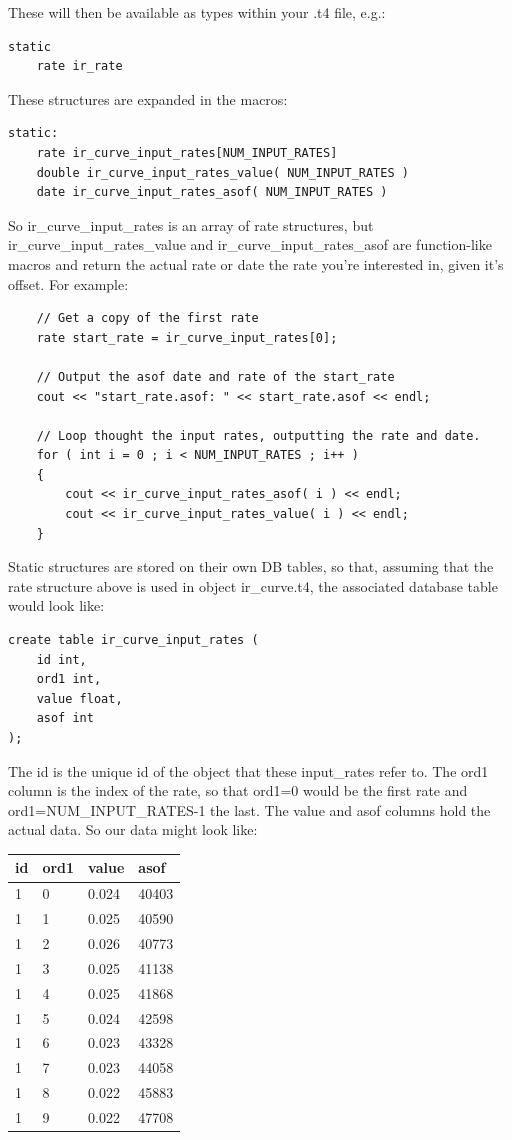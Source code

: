 \documentclass{report}
\begin{document}
These will then be available as types within your .t4 file, e.g.:

\begin{verbatim}
static
    rate ir_rate
\end{verbatim}

These structures are expanded in the macros:

\begin{verbatim}
static:
    rate ir_curve_input_rates[NUM_INPUT_RATES]
    double ir_curve_input_rates_value( NUM_INPUT_RATES )
    date ir_curve_input_rates_asof( NUM_INPUT_RATES )
\end{verbatim}

So ir_curve_input_rates is an array of rate structures, but ir_curve_input_rates_value and ir_curve_input_rates_asof are function-like macros and return the actual rate or date the rate you're interested in, given it's offset. For example:

\begin{verbatim}
    // Get a copy of the first rate
    rate start_rate = ir_curve_input_rates[0];

    // Output the asof date and rate of the start_rate
    cout << "start_rate.asof: " << start_rate.asof << endl;

    // Loop thought the input rates, outputting the rate and date.
    for ( int i = 0 ; i < NUM_INPUT_RATES ; i++ )
    {
        cout << ir_curve_input_rates_asof( i ) << endl;
        cout << ir_curve_input_rates_value( i ) << endl;
    }
\end{verbatim}


Static structures are stored on their own DB tables, so that, assuming that the rate structure above is used in object ir_curve.t4, the associated database table would look like:

\begin{verbatim}
create table ir_curve_input_rates (
    id int,
    ord1 int,
    value float,
    asof int
);
\end{verbatim}

The id is the unique id of the object that these input_rates refer to. The ord1 column is the index of the rate, so that ord1=0 would be the first rate and ord1=NUM_INPUT_RATES-1 the last. The value and asof columns hold the actual data. So our data might look like:

\begin {tabular} {| l | l | l | l |}
\hline
id & ord1 & value & asof \\
\hline
1 & 0 & 0.024 & 40403 \\
\hline
1 & 1 & 0.025 & 40590 \\
\hline
1 & 2 & 0.026 & 40773 \\
\hline
1 & 3 & 0.025 & 41138 \\
\hline
1 & 4 & 0.025 & 41868 \\
\hline
1 & 5 & 0.024 & 42598 \\
\hline
1 & 6 & 0.023 & 43328 \\
\hline
1 & 7 & 0.023 & 44058 \\
\hline
1 & 8 & 0.022 & 45883 \\
\hline
1 & 9 & 0.022 & 47708 \\
\hline
\end {tabular}
\end{document}
